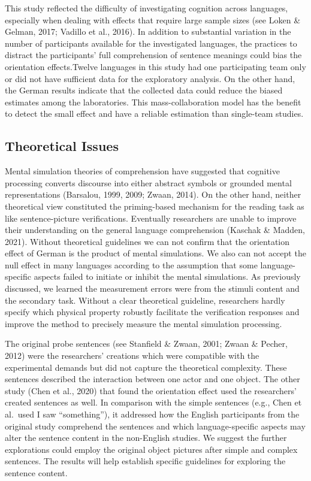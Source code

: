 \documentclass[
  man]{apa7}
\begin{document}
This study reflected the difficulty of investigating cognition across languages, especially when dealing with effects that require large sample sizes (see Loken \& Gelman, 2017; Vadillo et al., 2016). In addition to substantial variation in the number of participants available for the investigated languages, the practices to distract the participants' full comprehension of sentence meanings could bias the orientation effects.Twelve languages in this study had one participating team only or did not have sufficient data for the exploratory analysis. On the other hand, the German results indicate that the collected data could reduce the biased estimates among the laboratories. This mass-collaboration model has the benefit to detect the small effect and have a reliable estimation than single-team studies.

\hypertarget{theoretical-issues}{%
\subsection{Theoretical Issues}\label{theoretical-issues}}

Mental simulation theories of comprehension have suggested that cognitive processing converts discourse into either abstract symbols or grounded mental representations (Barsalou, 1999, 2009; Zwaan, 2014). On the other hand, neither theoretical view constituted the priming-based mechanism for the reading task as like sentence-picture verifications. Eventually researchers are unable to improve their understanding on the general language comprehension (Kaschak \& Madden, 2021). Without theoretical guidelines we can not confirm that the orientation effect of German is the product of mental simulations. We also can not accept the null effect in many languages according to the assumption that some language-specific aspects failed to initiate or inhibit the mental simulations. As previously discussed, we learned the measurement errors were from the stimuli content and the secondary task. Without a clear theoretical guideline, researchers hardly specify which physical property robustly facilitate the verification responses and improve the method to precisely measure the mental simulation processing.

The original probe sentences (see Stanfield \& Zwaan, 2001; Zwaan \& Pecher, 2012) were the researchers' creations which were compatible with the experimental demands but did not capture the theoretical complexity. These sentences described the interaction between one actor and one object. The other study (Chen et al., 2020) that found the orientation effect used the researchers' created sentences as well. In comparison with the simple sentences (e.g., Chen et al.~used I saw ``something''), it addressed how the English participants from the original study comprehend the sentences and which language-specific aspects may alter the sentence content in the non-English studies. We suggest the further explorations could employ the original object pictures after simple and complex sentences. The results will help establish specific guidelines for exploring the sentence content.
\end{document}
